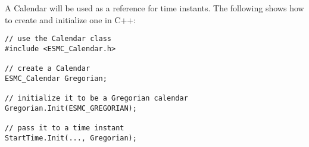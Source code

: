 
A Calendar will be used as a reference for time instants.
The following shows how to create and initialize one in C++:

\begin{verbatim}
// use the Calendar class
#include <ESMC_Calendar.h>

// create a Calendar
ESMC_Calendar Gregorian;

// initialize it to be a Gregorian calendar
Gregorian.Init(ESMC_GREGORIAN);

// pass it to a time instant
StartTime.Init(..., Gregorian);
\end{verbatim}
